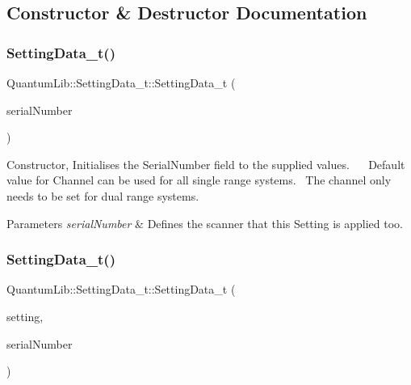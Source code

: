 \subsection{Constructor \& Destructor Documentation}
\mbox{\label{struct_quantum_lib_1_1_setting_data__t_aea4f34641cefd607673f71a52ac5738d}} 
\subsubsection{\texorpdfstring{Setting\+Data\+\_\+t()}{SettingData\_t()}\hspace{0.1cm}{\footnotesize\ttfamily [1/2]}}
{\footnotesize\ttfamily Quantum\+Lib\+::\+Setting\+Data\+\_\+t\+::\+Setting\+Data\+\_\+t (\begin{DoxyParamCaption}\item[{uint32\+\_\+t}]{serial\+Number }\end{DoxyParamCaption})\hspace{0.3cm}{\ttfamily [inline]}}

Constructor, Initialises the Serial\+Number field to the supplied values.~\newline
~\newline
Default value for Channel can be used for all single range systems.~\newline
The channel only needs to be set for dual range systems. 
\begin{DoxyParams}{Parameters}
{\em serial\+Number} & Defines the scanner that this Setting is applied too. \\
\hline
\end{DoxyParams}
\mbox{\label{struct_quantum_lib_1_1_setting_data__t_a33c4a2b2ab18ff5a1585b16671051be7}} 
\subsubsection{\texorpdfstring{Setting\+Data\+\_\+t()}{SettingData\_t()}\hspace{0.1cm}{\footnotesize\ttfamily [2/2]}}
{\footnotesize\ttfamily Quantum\+Lib\+::\+Setting\+Data\+\_\+t\+::\+Setting\+Data\+\_\+t (\begin{DoxyParamCaption}\item[{\mbox{\hyperlink{namespace_quantum_lib_acc8124e3e65bca4aa798d03a55e3d54c}{e\+Settings\+\_\+t}}}]{setting,  }\item[{uint32\+\_\+t}]{serial\+Number }\end{DoxyParamCaption})\hspace{0.3cm}{\ttfamily [inline]}}

